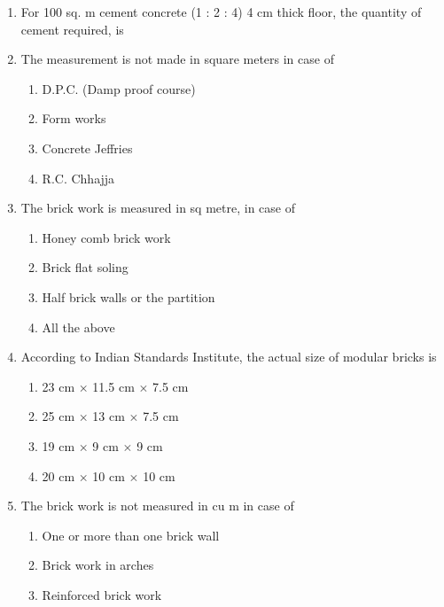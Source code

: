 \documentclass[11pt,a4paper]{article}
\begin{document}
\begin{enumerate}
\item{For 100 sq. m cement concrete (1 : 2 : 4) 4 cm thick floor, the quantity of cement required, is}
\\
\item{The measurement is not made in square meters in case of}
\begin{enumerate}[label=\Alph*.]
\item{D.P.C. (Damp proof course)}
\item{Form works}
\item{Concrete Jeffries}
\item{R.C. Chhajja}
\end{enumerate}
\item{The brick work is measured in sq metre, in case of}
\begin{enumerate}[label=\Alph*.]
\item{Honey comb brick work}
\item{Brick flat soling}
\item{Half brick walls or the partition}
\item{All the above}
\end{enumerate}
\item{According to Indian Standards Institute, the actual size of modular bricks is}
\begin{enumerate}[label=\Alph*.]
\item{23 cm $\times$ 11.5 cm $\times$ 7.5 cm}
\item{25 cm $\times$ 13 cm $\times$ 7.5 cm}
\item{19 cm $\times$ 9 cm $\times$ 9 cm}
\item{20 cm $\times$ 10 cm $\times$ 10 cm}
\end{enumerate}
\item{The brick work is not measured in cu m in case of}
\begin{enumerate}[label=\Alph*.]
\item{One or more than one brick wall}
\item{Brick work in arches}
\item{Reinforced brick work}

\end{enumerate}
\end{enumerate}
\end{document}
